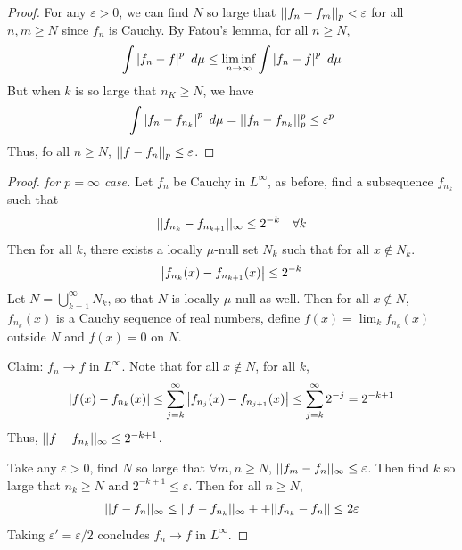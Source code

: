 \documentclass[11pt]{article}
\newcommand{\dmu}[0]{\ d\mu}
\begin{document}
\begin{theorem}
\begin{proof}
			For any $\varepsilon > 0$, we can find $N$ so large that $\vert \vert {f_n - f_m} \vert \vert_p < \varepsilon$ for all $n, m \geq N$ since $f_n$ is Cauchy.
			By Fatou's lemma, for all $n \geq N$,
			\begin{align}
				\int \abs{f_n - f}^p\dmu \leq \liminf_{n \to \infty} \int \abs{f_n - f}^p\dmu
			\end{align}
			But when $k$ is so large that $n_K \geq N$, we have
			\begin{align}
				\int \abs{f_n - f_{n_k}}^p\dmu = \norm{f_n - f_{n_k}}_p^p \leq \varepsilon^p
			\end{align}
			Thus, fo all $n \geq N$, $\vert \vert {f - f_n} \vert \vert_p \leq \varepsilon$.
		\end{proof}
		\begin{proof}[Proof. for $p = \infty$ case]
			Let $f_n$ be Cauchy in $L^\infty$, as before, find a subsequence $f_{n_k}$ such that
			\begin{align}
				\vert \vert {f_{n_k} - f_{n_{k+1}}} \vert \vert_\infty \leq 2^{-k}\quad \forall k
			\end{align}
			Then for all $k$, there exists a locally $\mu$-null set $N_k$ such that for all $x \notin N_k$.
			\begin{align}
				\left \vert {f_{n_k}(x) - f_{n_{k+1}}(x)} \right \vert \leq 2^{-k}
			\end{align}
			Let $N = \bigcup_{k=1}^\infty N_k$, so that $N$ is locally $\mu$-null as well.
			Then for all $x \notin N$, $f_{n_k}(x)$ is a Cauchy sequence of real numbers, define $f(x) = \lim_k f_{n_k}(x)$ outside $N$ and $f(x) = 0$ on $N$.
			
			Claim: $f_n \to f$ in $L^\infty$. Note that for all $x \notin N$, for all $k$,
			\begin{align}
				\left \vert {f(x) - f_{n_k}(x)} \right \vert \leq \sum_{j=k}^\infty \left \vert {f_{n_j}(x) - f_{n_{j+1}}(x)} \right \vert \leq \sum_{j=k}^\infty 2^{-j} = 2^{-k+1}
			\end{align}
			Thus, $\vert \vert {f - f_{n_k}} \vert \vert_\infty \leq 2^{-k+1}$.
			
			Take any $\varepsilon > 0$, find $N$ so large that $\forall m, n \geq N$, $\vert \vert {f_m - f_n} \vert \vert_\infty \leq \varepsilon$. Then find $k$ so large that $n_k \geq N$ and $2^{-k+1} \leq \varepsilon$. Then for all $n \geq N$,
			\begin{align}
				\vert \vert {f - f_n} \vert \vert_\infty \leq \vert \vert {f - f_{n_k}} \vert \vert_\infty + + \vert \vert {f_{n_k} - f_n} \vert \vert \leq 2 \varepsilon
			\end{align}
			Taking $\varepsilon' = \varepsilon/2$ concludes $f_n \to f$ in $L^\infty$.
		\end{proof}
	\end{theorem}
	
\end{document}
